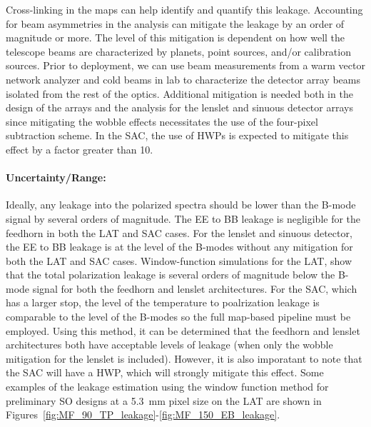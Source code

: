 Cross-linking in the maps can help identify and quantify this leakage. Accounting for beam asymmetries in the analysis can mitigate the leakage by an order of magnitude or more. The level of this mitigation is dependent on how well the telescope beams are characterized by planets, point sources, and/or calibration sources. Prior to deployment, we can use beam measurements from a warm vector network analyzer and cold beams in lab to characterize the detector array beams isolated from the rest of the optics. Additional mitigation is needed both in the design of the arrays and the analysis for the lenslet and sinuous detector arrays since mitigating the wobble effects necessitates the use of the four-pixel subtraction scheme. In the SAC, the use of HWPs is expected to mitigate this effect by a factor greater than 10.


\paragraph{Uncertainty/Range:}
Ideally, any leakage into the polarized spectra should be lower than the B-mode signal by several orders of magnitude. The EE to BB leakage is negligible for the feedhorn in both the LAT and SAC cases. For the lenslet and sinuous detector, the EE to BB leakage is at the level of the B-modes without any mitigation for both the LAT and SAC cases. Window-function simulations for the LAT, show that the total polarization leakage is several orders of magnitude below the B-mode signal for both the feedhorn and lenslet architectures. For the SAC, which has a larger stop, the level of the temperature to poalrization leakage is comparable to the level of the B-modes so the full map-based pipeline must be employed. Using this method, it can be determined that the feedhorn and lenslet architectures both have acceptable levels of leakage (when only the wobble mitigation for the lenslet is included). However, it is also imporatant to note that the SAC will have a HWP, which will strongly mitigate this effect. Some examples of the leakage estimation using the window function method for preliminary SO designs at a 5.3~mm pixel size on the LAT are shown in Figures~\ref{fig:MF_90_TP_leakage}-\ref{fig:MF_150_EB_leakage}.

